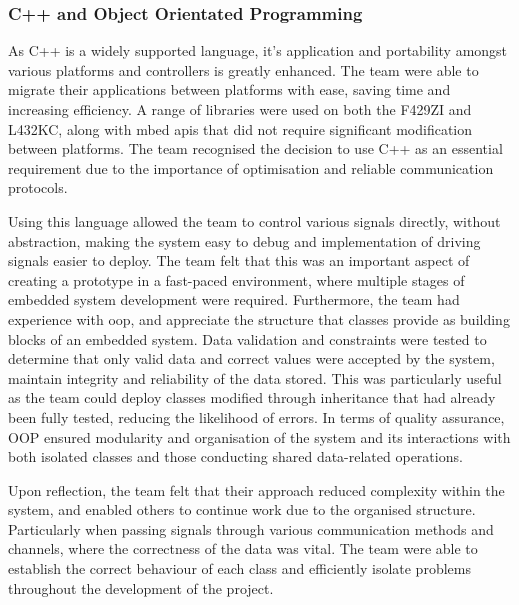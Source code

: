 \documentclass [12pt]{article}
\begin{document}
\subsubsection{C++ and Object Orientated Programming}
As C++ is a widely supported language, it’s application and portability amongst various platforms and controllers is greatly enhanced. The team were able to migrate their applications between platforms with ease, saving time and increasing efficiency. A range of libraries were used on both the F429ZI and L432KC, along with mbed \gls{api}s that did not require significant modification between platforms. The team recognised the decision to use C++ as an essential requirement due to the importance of optimisation and reliable communication protocols.  

Using this language allowed the team to control various signals directly, without abstraction, making the system easy to debug and implementation of driving signals easier to deploy. The team felt that this was an important aspect of creating a prototype in a fast-paced environment, where multiple stages of embedded system development were required. Furthermore, the team had experience with \gls{oop}, and appreciate the structure that classes provide as building blocks of an embedded system. Data validation and constraints were tested to determine that only valid data and correct values were accepted by the system, maintain integrity and reliability of the data stored. This was particularly useful as the team could deploy classes modified through inheritance that had already been fully tested, reducing the likelihood of errors. In terms of quality assurance, OOP ensured modularity and organisation of the system and its interactions with both isolated classes and those conducting shared data-related operations.  

Upon reflection, the team felt that their approach reduced complexity within the system, and enabled others to continue work due to the organised structure. Particularly when passing signals through various communication methods and channels, where the correctness of the data was vital. The team were able to establish the correct behaviour of each class and efficiently isolate problems throughout the development of the project. 
\end{document}
